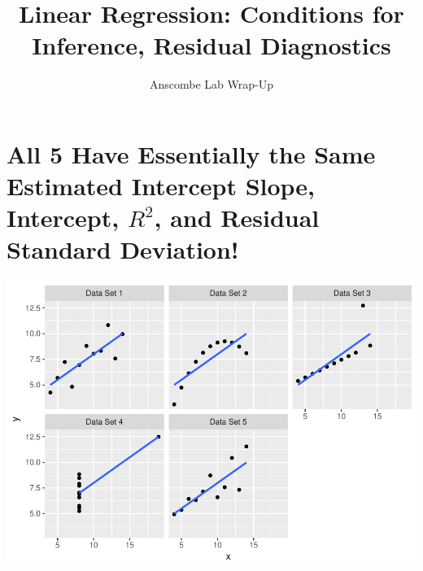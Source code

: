 \documentclass[]{article}
\title{Linear Regression: Conditions for Inference, Residual Diagnostics}
\subtitle{Anscombe Lab Wrap-Up}
\author{}
\date{}
\begin{document}
\maketitle

\section{\texorpdfstring{All 5 Have Essentially the Same Estimated
Intercept Slope, Intercept, \(R^2\), and Residual Standard
Deviation!}{All 5 Have Essentially the Same Estimated Intercept Slope, Intercept, R\^{}2, and Residual Standard Deviation!}}\label{all-5-have-essentially-the-same-estimated-intercept-slope-intercept-r2-and-residual-standard-deviation}

\includegraphics{20180417_anscombe_residuals_files/figure-latex/unnamed-chunk-1-1.pdf}
\end{document}
